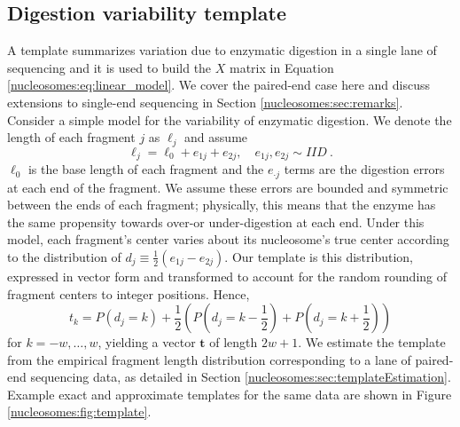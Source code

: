 \subsection{Digestion variability template}
\label{nucleosomes:sec:template}

A template summarizes variation due to enzymatic digestion in a single lane of sequencing and it is used to build the $X$ matrix in Equation \ref{nucleosomes:eq:linear_model}.
We cover the paired-end case here and discuss extensions to single-end sequencing in Section \ref{nucleosomes:sec:remarks}.
%
%
%
%
Consider a simple model for the variability of enzymatic digestion.
We denote the length of each fragment $j$ as $\ell_j$ and assume
\begin{equation}
\ell_j = \ell_0 + e_{1j} + e_{2j}, \quad e_{1j}, e_{2j} \sim IID \ .
\end{equation}
$\ell_0$ is the base length of each fragment and the $e_{\cdot j}$ terms are the digestion errors at each end of the fragment.
We assume these errors are bounded and symmetric between the ends of each fragment; physically, this means that the enzyme has the same propensity towards over-or under-digestion at each end.
Under this model, each fragment's center varies about its nucleosome's true center according to the distribution of $d_j \equiv \frac{1}{2} (e_{1j} - e_{2j})$.
Our template is this distribution, expressed in vector form and transformed to account for the random rounding of fragment centers to integer positions.
Hence, 
\begin{equation}
t_k = P(d_j = k) + \frac{1}{2}\left( P(d_j = k - \frac{1}{2}) + P(d_j = k + \frac{1}{2}) \right)
\end{equation}
for $k = -w, \dots, w$, yielding a vector $\bm t$ of length $2w + 1$.
We estimate the template from the empirical fragment length distribution corresponding to a lane of paired-end sequencing data, as detailed in Section \ref{nucleosomes:sec:templateEstimation}. 
%
%
%
Example exact and approximate templates for the same data are shown in Figure \ref{nucleosomes:fig:template}.

